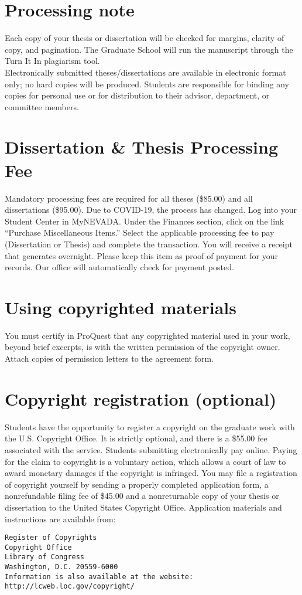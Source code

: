 \section{Processing note}
Each copy of your thesis or dissertation will be checked for margins, clarity of copy, and pagination. The Graduate School will run the manuscript through the Turn It In plagiarism tool. \\

Electronically submitted theses/dissertations are available in electronic format only; no hard copies will be produced. Students are responsible for binding any copies for personal use or for distribution to their advisor, department, or committee members.

\section{Dissertation \& Thesis Processing Fee}
Mandatory processing fees are required for all theses (\$85.00) and all dissertations (\$95.00). Due to COVID-19, the process has changed. Log into your Student Center in MyNEVADA. Under the Finances section, click on the link “Purchase Miscellaneous Items.” Select the applicable processing fee to pay (Dissertation or Thesis) and complete the transaction. You will receive a receipt that generates overnight.  Please keep this item as proof of payment for your records. Our office will automatically check for payment posted.

\section{Using copyrighted materials}
You must certify in ProQuest that any copyrighted material used in your work, beyond brief excerpts, is with the written permission of the copyright owner. Attach copies of permission letters to the agreement form.

\section{Copyright registration (optional)}
Students have the opportunity to register a copyright on the graduate work with the U.S. Copyright Office. It is strictly optional, and there is a \$55.00 fee associated with the service. Students submitting electronically pay online. Paying for the claim to copyright is a voluntary action, which allows a court of law to award monetary damages if the copyright is infringed. You may file a registration of copyright yourself by sending a properly completed application form, a nonrefundable filing fee of \$45.00 and a nonreturnable copy of your thesis or dissertation to the United States Copyright Office. Application materials and instructions are available from: \begin{verbatim}
Register of Copyrights 
Copyright Office 
Library of Congress 
Washington, D.C. 20559-6000 
Information is also available at the website:
http://lcweb.loc.gov/copyright/
\end{verbatim}
